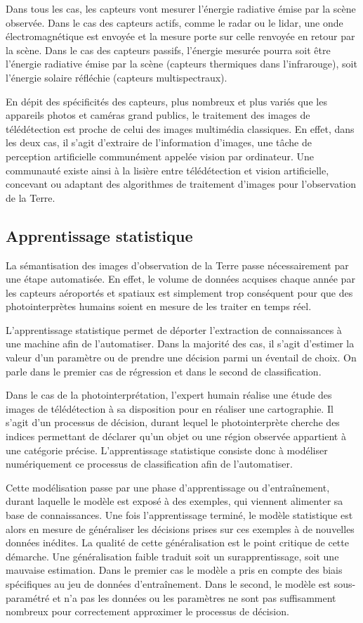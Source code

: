 Dans tous les cas, les capteurs vont mesurer l'énergie radiative émise par la scène observée. Dans le cas des capteurs actifs, comme le radar ou le lidar, une onde électromagnétique est envoyée et la mesure porte sur celle renvoyée en retour par la scène. Dans le cas des capteurs passifs, l'énergie mesurée pourra soit être l'énergie radiative émise par la scène (capteurs thermiques dans l'infrarouge), soit l'énergie solaire réfléchie (capteurs multispectraux).

En dépit des spécificités des capteurs, plus nombreux et plus variés que les appareils photos et caméras grand publics, le traitement des images de télédétection est proche de celui des images multimédia classiques. En effet, dans les deux cas, il s'agit d'extraire de l'information d'images, une tâche de perception artificielle communément appelée vision par ordinateur. Une communauté existe ainsi à la lisière entre télédétection et vision artificielle, concevant ou adaptant des algorithmes de traitement d'images pour l'observation de la Terre.

\subsection{Apprentissage statistique}

La sémantisation des images d'observation de la Terre passe nécessairement par une étape automatisée. En effet, le volume de données acquises chaque année par les capteurs aéroportés et spatiaux est simplement trop conséquent pour que des photointerprètes humains soient en mesure de les traiter en temps réel.

L'apprentissage statistique permet de déporter l'extraction de connaissances à une machine afin de l'automatiser. Dans la majorité des cas, il s'agit d'estimer la valeur d'un paramètre ou de prendre une décision parmi un éventail de choix. On parle dans le premier cas de régression et dans le second de classification.

Dans le cas de la photointerprétation, l'expert humain réalise une étude des images de télédétection à sa disposition pour en réaliser une cartographie. Il s'agit d'un processus de décision, durant lequel le photointerprète cherche des indices permettant de déclarer qu'un objet ou une région observée appartient à une catégorie précise. L'apprentissage statistique consiste donc à modéliser numériquement ce processus de classification afin de l'automatiser.

Cette modélisation passe par une phase d'apprentissage ou d'entraînement, durant laquelle le modèle est exposé à des exemples, qui viennent alimenter sa base de connaissances. Une fois l'apprentissage terminé, le modèle statistique est alors en mesure de généraliser les décisions prises sur ces exemples à de nouvelles données inédites. La qualité de cette généralisation est le point critique de cette démarche. Une généralisation faible traduit soit un surapprentissage, soit une mauvaise estimation. Dans le premier cas le modèle a pris en compte des biais spécifiques au jeu de données d'entraînement. Dans le second, le modèle est sous-paramétré et n'a pas les données ou les paramètres ne sont pas suffisamment nombreux pour correctement approximer le processus de décision.

